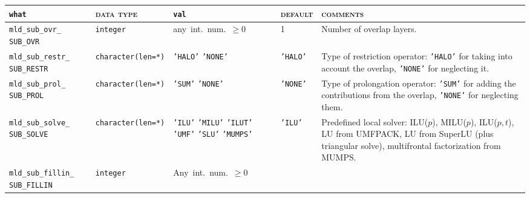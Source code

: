 \bsideways
\begin{center}
\begin{tabular}{|p{3.5cm}|l|p{3.2cm}|l|p{5cm}|}
\hline
\verb|what|              & \textsc{data type}        &  \verb|val|      &  \textsc{default}  &
\textsc{comments} \\ \hline
\verb|mld_sub_ovr_|  \break \verb|SUB_OVR|      & \verb|integer|
                         & any~int.~num.~$\ge 0$
                         & 1
                         & Number of overlap layers. \\ \hline
\verb|mld_sub_restr_|  \break \verb|SUB_RESTR|   & \verb|character(len=*)|
                         & \texttt{'HALO'} \hspace{2.5cm} \texttt{'NONE'}
                         & \texttt{'HALO'}
                         & Type of restriction operator:
                           \texttt{'HALO'} for taking into account the overlap, \texttt{'NONE'} 
                           for neglecting it. \\ \hline
\verb|mld_sub_prol_| \break \verb|SUB_PROL|   & \verb|character(len=*)|
                         & \texttt{'SUM'} \hspace{2.5cm} \texttt{'NONE'}
                         & \texttt{'NONE'}
                         & Type of prolongation operator:
                           \texttt{'SUM'} for adding the contributions from the overlap, \texttt{'NONE'}
                           for neglecting them.   \\ \hline
\verb|mld_sub_solve_| \break \verb|SUB_SOLVE|    & \verb|character(len=*)|
                         & \texttt{'ILU'} \hspace{2.5cm} \texttt{'MILU'} \hspace{2.5cm} \texttt{'ILUT'} 
                           \hspace{2.5cm} \texttt{'UMF'} \hspace{2.5cm} \texttt{'SLU'} \hspace{2.5cm} \texttt{'MUMPS'}
                         & \texttt{'ILU'}
                         & Predefined local solver: ILU($p$),
                         MILU($p$), ILU($p,t$), LU from UMFPACK, LU  from SuperLU 
                           (plus triangular solve), multifrontal factorization from MUMPS. \\ \hline  
\verb|mld_sub_fillin_| \break \verb|SUB_FILLIN|  & \verb|integer|
                         & Any~int.~num.~$\ge 0$

\end{tabular}
\end{center}
